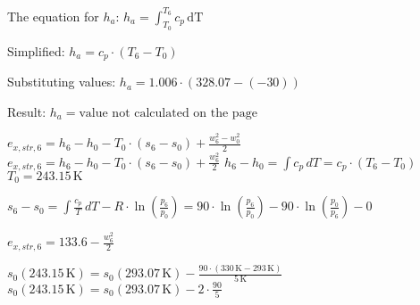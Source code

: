 The equation for \( h_a \):  
\( h_a = \int_{T_0}^{T_6} c_p \, \text{dT} \)  

Simplified:  
\( h_a = c_p \cdot (T_6 - T_0) \)  

Substituting values:  
\( h_a = 1.006 \cdot (328.07 - (-30)) \)  

Result:  
\( h_a = \text{value not calculated on the page} \)

\( e_{x,str,6} = h_6 - h_0 - T_0 \cdot (s_6 - s_0) + \frac{w_6^2 - w_0^2}{2} \)  
\( e_{x,str,6} = h_6 - h_0 - T_0 \cdot (s_6 - s_0) + \frac{w_6^2}{2} \)  
\( h_6 - h_0 = \int c_p \, dT = c_p \cdot (T_6 - T_0) \)  
\( T_0 = 243.15 \, \text{K} \)  

\( s_6 - s_0 = \int \frac{c_p}{T} \, dT - R \cdot \ln \left( \frac{p_6}{p_0} \right) = 90 \cdot \ln \left( \frac{p_6}{p_0} \right) - 90 \cdot \ln \left( \frac{p_0}{p_6} \right) - 0 \)  

\( e_{x,str,6} = 133.6 - \frac{w_6^2}{2} \)  

\( s_0 (243.15 \, \text{K}) = s_0 (293.07 \, \text{K}) - \frac{90 \cdot (330 \, \text{K} - 293 \, \text{K})}{5 \, \text{K}} \)  
\( s_0 (243.15 \, \text{K}) = s_0 (293.07 \, \text{K}) - 2 \cdot \frac{90}{5} \)